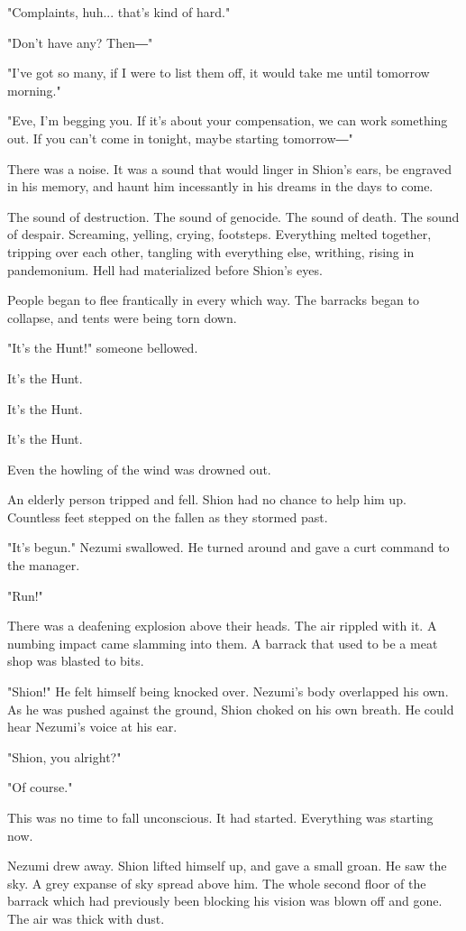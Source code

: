 "Complaints, huh... that's kind of hard."

"Don't have any? Then―"

"I've got so many, if I were to list them off, it would take me until
tomorrow morning."

"Eve, I'm begging you. If it's about your compensation, we can work
something out. If you can't come in tonight, maybe starting tomorrow―"

There was a noise. It was a sound that would linger in Shion's ears, be
engraved in his memory, and haunt him incessantly in his dreams in the
days to come.

The sound of destruction. The sound of genocide. The sound of death. The
sound of despair. Screaming, yelling, crying, footsteps. Everything
melted together, tripping over each other, tangling with everything
else, writhing, rising in pandemonium. Hell had materialized before
Shion's eyes.

People began to flee frantically in every which way. The barracks began
to collapse, and tents were being torn down.

"It's the Hunt!" someone bellowed.

It's the Hunt.

It's the Hunt.

It's the Hunt.

Even the howling of the wind was drowned out.

An elderly person tripped and fell. Shion had no chance to help him up.
Countless feet stepped on the fallen as they stormed past.

"It's begun." Nezumi swallowed. He turned around and gave a curt command
to the manager.

"Run!"

There was a deafening explosion above their heads. The air rippled with
it. A numbing impact came slamming into them. A barrack that used to be
a meat shop was blasted to bits.

"Shion!" He felt himself being knocked over. Nezumi's body overlapped
his own. As he was pushed against the ground, Shion choked on his own
breath. He could hear Nezumi's voice at his ear.

"Shion, you alright?"

"Of course."

This was no time to fall unconscious. It had started. Everything was
starting now.

Nezumi drew away. Shion lifted himself up, and gave a small groan. He
saw the sky. A grey expanse of sky spread above him. The whole second
floor of the barrack which had previously been blocking his vision was
blown off and gone. The air was thick with dust.

